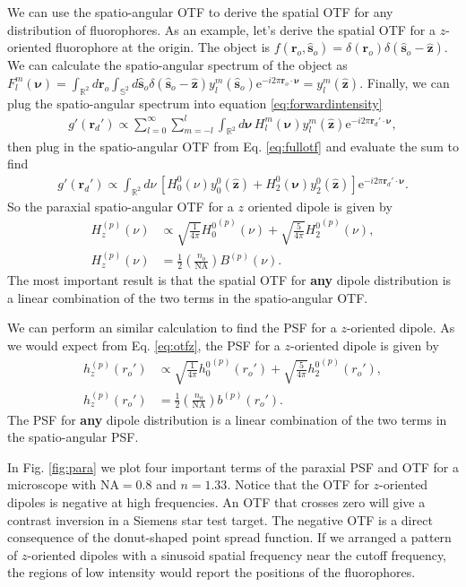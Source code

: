 \documentclass[11pt]{article}
\newcommand{\me}{\mathrm{e}}
\providecommand{\ro}[1]{\mathbf{\mathbf{r}}_o}
\providecommand{\so}[1]{\mathbf{\hat{s}}_o}
\providecommand{\rd}[1]{\mathbf{r}_d}
\providecommand{\mh}[1]{\mathbf{\hat{#1}}}
\providecommand{\bs}[1]{\boldsymbol{#1}}
\begin{document}
We can use the spatio-angular OTF to derive the spatial OTF for any distribution
of fluorophores. As an example, let's derive the spatial OTF for a $z$-oriented
fluorophore at the origin. The object is
$f(\ro{}, \so{}) = \delta(\ro{})\delta(\so{} - \mh{z})$. We can calculate the
spatio-angular spectrum of the object as
$F_l^m(\bs{\nu}) = \int_{\mathbb{R}^2}d\ro{}\int_{\mathbb{S}^2}d\so{}
\delta(\so{} - \mh{z})y_l^m(\so{})\me{}^{-i2\pi \ro{}\cdot\bs{\nu}} =
y_l^m(\mh{z})$. Finally, we can plug the spatio-angular spectrum into equation
\ref{eq:forwardintensity}
\begin{align}
  g'(\rd{}') \propto \sum_{l=0}^{\infty} \sum_{m=-l}^l \int_{\mathbb{R}^2}d\bs{\nu}{}\, H_l^m(\bs{\nu}) y_l^m(\mh{z}) \me^{-i 2\pi \rd{}'\cdot\bs{\nu}}, 
\end{align}
then plug in the spatio-angular OTF from Eq. \ref{eq:fullotf} and evaluate the
sum to find
\begin{align}
  g'(\rd{}') \propto \int_{\mathbb{R}^2}d\nu{}\, \left[H_0^0(\nu)y_0^0(\mh{z}) + H_2^0(\bs{\nu})y_2^0(\mh{z})\right] \me^{-i 2\pi \rd{}'\cdot\bs{\nu}}. 
\end{align}
So the paraxial spatio-angular OTF for a $z$ oriented dipole is given by
\begin{align}
  H_z^{(p)}(\nu) &\propto \sqrt{\frac{1}{4\pi}}{H_0^0}^{(p)}(\nu) + \sqrt{\frac{5}{4\pi}}{H_2^0}^{(p)}(\nu), \\ \label{eq:otfz}
    H_z^{(p)}(\nu) &= \frac{1}{2}\left(\frac{n_o}{\text{NA}}\right) B^{(p)}(\nu).
\end{align}
The most important result is that the spatial OTF for \textbf{any} dipole
distribution is a linear combination of the two terms in the spatio-angular OTF.

We can perform an similar calculation to find the PSF for a $z$-oriented dipole.
As we would expect from Eq. \ref{eq:otfz}, the PSF for a $z$-oriented dipole
is given by
\begin{align}
  h_z^{(p)}(r_o') &\propto \sqrt{\frac{1}{4\pi}}{h_0^0}^{(p)}(r_o') + \sqrt{\frac{5}{4\pi}}{h_2^0}^{(p)}(r_o'), \\ \label{eq:psfz}
  h_z^{(p)}(r_o') &= \frac{1}{2}\left(\frac{n_o}{\text{NA}}\right) b^{(p)}(r_o').
\end{align}
The PSF for \textbf{any} dipole distribution is a linear combination of the two terms in
the spatio-angular PSF.

In Fig. \ref{fig:para} we plot four important terms of the paraxial PSF and OTF
for a microscope with $\text{NA}=0.8$ and $n=1.33$. Notice that the OTF for
$z$-oriented dipoles is negative at high frequencies. An OTF that crosses zero
will give a contrast inversion in a Siemens star test target. The negative OTF
is a direct consequence of the donut-shaped point spread function. If we
arranged a pattern of $z$-oriented dipoles with a sinusoid spatial frequency
near the cutoff frequency, the regions of low intensity would report the
positions of the fluorophores.
\end{document}
